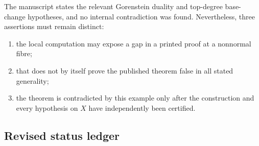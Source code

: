 \documentclass[
  10pt,
  letterpaper,
]{article}
\providecommand{\tightlist}{%
  \setlength{\itemsep}{0pt}\setlength{\parskip}{0pt}}
\begin{document}
The manuscript states the relevant Gorenstein duality and top-degree
base-change hypotheses, and no internal contradiction was found.
Nevertheless, three assertions must remain distinct:

\begin{enumerate}
\def\labelenumi{\arabic{enumi}.}
\tightlist
\item
  the local computation may expose a gap in a printed proof at a
  nonnormal fibre;
\item
  that does not by itself prove the published theorem false in all
  stated generality;
\item
  the theorem is contradicted by this example only after the
  construction and every hypothesis on \(X\) have independently been
  certified.
\end{enumerate}

\subsection{Revised status ledger}\label{revised-status-ledger}
\end{document}
